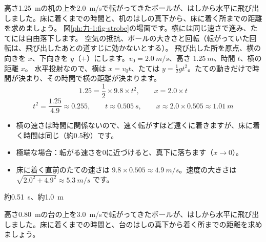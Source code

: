 \begin{phreidai}[机から飛び出すボール]
\label{ph:力-1:ex5}高さ\qty{1.25}{m}の机の上を\qty{2.0}{m/s}で転がってきたボールが、はしから水平に飛び出しました。床に着くまでの時間と、机のはしの真下から、床に着く所までの距離を求めましょう。
\phbamen
図\ref{ph:力-1:fig-strobe}の場面です。横には同じ速さで進み、たてには自由落下します。
\phmushi
空気の抵抗、ボールの大きさと回転（転がっていた回転は、飛び出したあとの道すじに効かないとする）。
\phzu
飛び出した所を原点、横の向きを $x$、下向きを $y$（$+$）にします。$v_0=\qty{2.0}{m/s}$、高さ $\qty{1.25}{m}$、時間 $t$、横の距離 $x$。
\phriyu
水平投射なので、横は $x=v_0t$、たては $y=\tfrac{1}{2}gt^2$。たての動きだけで時間が決まり、その時間で横の距離が決まります。
\phtateru
\[ 1.25=\frac{1}{2}\times9.8\times t^2,\qquad x=2.0\times t \]
\phtoku
\[ t^2=\frac{1.25}{4.9}\approx0.255,\qquad t\approx\qty{0.505}{s},\qquad x\approx2.0\times0.505\approx\qty{1.01}{m} \]
\phtashikame
\begin{itemize}[leftmargin=1.2\zw, itemsep=1pt, topsep=1pt, label={\color{bkTheme}●}]
\item 横の速さは時間に関係ないので、速く転がすほど遠くに着きますが、床に着く時間は同じ（約0.5秒）です。
\item 極端な場合：転がる速さを0に近づけると、真下に落ちます（$x\to0$）。
\item 床に着く直前のたての速さは $9.8\times0.505\approx\qty{4.9}{m/s}$。速度の大きさは $\sqrt{2.0^2+4.9^2}\approx\qty{5.3}{m/s}$ です。
\end{itemize}
\kotae 約\qty{0.51}{s}、約\qty{1.0}{m}
\end{phreidai}
\begin{jibun}
高さ\qty{0.80}{m}の台の上を\qty{3.0}{m/s}で転がってきたボールが、はしから水平に飛び出しました。床に着くまでの時間と、台のはしの真下から着く所までの距離を求めましょう。
\end{jibun}

